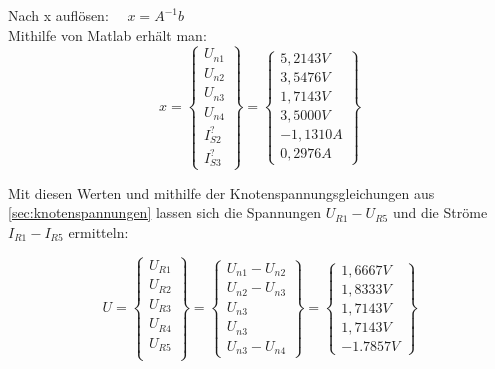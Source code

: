 \documentclass[11pt]{scrartcl}
\begin{document}
Nach x auflösen: \(\displaystyle \quad x = A^{-1} b \) \\

Mithilfe von Matlab erhält man:
\begin{equation*}
  \renewcommand{\arraystretch}{1.25}
  x = \left\{\begin{array}{c}
      U_{n1} \\
      U_{n2} \\
      U_{n3} \\
      U_{n4} \\
      I_{S2}^? \\
      I_{S3}^? \end{array}\right\} =
  \left\{ \begin{array}{c}
            5,2143 \unit{V}\\
    3,5476 \unit{V}\\
    1,7143 \unit{V}\\
    3,5000 \unit{V}\\
    -1,1310 \unit{A}\\
    0,2976 \unit{A} \end{array}\right\}
\end{equation*}

Mit diesen Werten und mithilfe der Knotenspannungsgleichungen aus \ref{sec:knotenspannungen} lassen sich die
Spannungen $U_{R1} - U_{R5}$ und die Ströme $I_{R1} - I_{R5}$ ermitteln:

\begin{equation*}
  \renewcommand{\arraystretch}{1.25}
  U = \left\{ \begin{array}{c}
                U_{R1} \\
                U_{R2} \\
                U_{R3} \\
                U_{R4} \\
                U_{R5} \\
                \end{array}
  \right\} =
  \left\{ \begin{array}{c}
                U_{n1} - U_{n2}\\
                U_{n2} - U_{n3} \\
                U_{n3} \\
                U_{n3} \\
                U_{n3} - U_{n4}
          \end{array}\right\} =
        \left\{ \begin{array}{c}
                  1,6667 \unit{V} \\
                  1,8333 \unit{V} \\
                  1,7143 \unit{V} \\
                  1,7143 \unit{V} \\
                  -1.7857 \unit{V}
                \end{array}\right\}
            \end{equation*}
\end{document}
